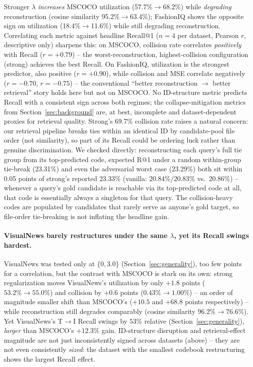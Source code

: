 Stronger $\lambda$ \emph{increases} MSCOCO utilization (57.7\%$\to$68.2\%) while \emph{degrading} reconstruction (cosine similarity 95.2\%$\to$63.4\%); FashionIQ shows the opposite sign on utilization (18.4\%$\to$11.6\%) while still degrading reconstruction. Correlating each metric against headline Recall@1 ($n=4$ per dataset, Pearson $r$, descriptive only) sharpens this: on MSCOCO, collision rate correlates \emph{positively} with Recall ($r{=}{+}0.79$) -- the worst-reconstruction, highest-collision configuration (strong) achieves the best Recall. On FashionIQ, utilization is the strongest predictor, also positive ($r{=}{+}0.90$), while collision and MSE correlate negatively ($r{=}{-}0.70$, $r{=}{-}0.75$) -- the conventional ``better reconstruction $\to$ better retrieval'' story holds here but not on MSCOCO. No ID-structure metric predicts Recall with a consistent sign across both regimes; the collapse-mitigation metrics from Section~\ref{sec:background} are, at best, incomplete and dataset-dependent proxies for retrieval quality. Strong's 69.7\% collision rate raises a natural concern: our retrieval pipeline breaks ties within an identical ID by candidate-pool file order (not similarity), so part of its Recall could be ordering luck rather than genuine discrimination. We checked directly: reconstructing each query's full tie group from its top-predicted code, expected R@1 under a random within-group tie-break (23.31\%) and even the adversarial worst case (23.29\%) both sit within 0.05 points of strong's reported 23.33\% (vanilla: 20.84\%/20.83\% vs.\ 20.86\%) -- whenever a query's gold candidate is reachable via its top-predicted code at all, that code is essentially always a singleton for that query. The collision-heavy codes are populated by candidates that rarely serve as anyone's gold target, so file-order tie-breaking is not inflating the headline gain.

\paragraph{VisualNews barely restructures under the same $\lambda$, yet its Recall swings hardest.} VisualNews was tested only at $\{0,3.0\}$ (Section~\ref{sec:generality}), too few points for a correlation, but the contrast with MSCOCO is stark on its own: strong regularization moves VisualNews's utilization by only $+1.8$ points ($53.2\%\to55.0\%$) and collision by $+0.6$ points ($0.43\%\to1.00\%$) -- an order of magnitude smaller shift than MSCOCO's ($+10.5$ and $+68.8$ points respectively) -- while reconstruction still degrades comparably (cosine similarity $96.2\%\to76.6\%$). Yet VisualNews's T$\to$I Recall swings by $53\%$ relative (Section~\ref{sec:generality}), \emph{larger} than MSCOCO's $+12.3\%$ gain. ID-structure disruption and retrieval-effect magnitude are not just inconsistently signed across datasets (above) -- they are not even consistently \emph{sized}: the dataset with the smallest codebook restructuring shows the largest Recall effect.

